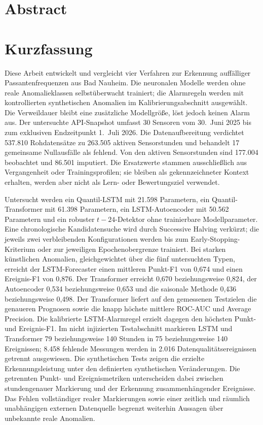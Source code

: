 \ifdefined\ThesisLanguageIsEnglish
\chapter*{Abstract}
\else
\chapter*{Kurzfassung}
\fi
\label{ch:Abstract}

Diese Arbeit entwickelt und vergleicht vier Verfahren zur Erkennung
auffälliger Passantenfrequenzen aus Bad Nauheim. Die neuronalen Modelle werden
ohne reale Anomalieklassen selbstüberwacht trainiert; die Alarmregeln werden
mit kontrollierten synthetischen Anomalien im Kalibrierungsabschnitt
ausgewählt. Die Verweildauer bleibt eine zusätzliche Modellgröße, löst jedoch
keinen Alarm aus. Der untersuchte API-Snapshot umfasst
30 Sensoren vom 30.~Juni 2025 bis zum exklusiven Endzeitpunkt 1.~Juli 2026.
Die Datenaufbereitung verdichtet 537.810 Rohdatensätze zu 263.505 aktiven
Sensorstunden und behandelt 17 gemeinsame Nullausfälle als fehlend. Von den
aktiven Sensorstunden sind 177.004 beobachtet und 86.501 imputiert. Die
Ersatzwerte stammen ausschließlich aus Vergangenheit oder Trainingsprofilen;
sie bleiben als gekennzeichneter Kontext erhalten, werden aber nicht als Lern-
oder Bewertungsziel verwendet.

Untersucht werden ein Quantil-LSTM mit 21.598 Parametern, ein
Quantil-Transformer mit 61.398 Parametern, ein LSTM-Autoencoder mit 50.562
Parametern und ein robuster $t-24$-Detektor ohne trainierbare
Modellparameter. Eine
chronologische Kandidatensuche wird durch Successive Halving verkürzt; die
jeweils zwei verbleibenden Konfigurationen werden bis zum
Early-Stopping-Kriterium oder zur jeweiligen Epochenobergrenze trainiert. Bei
starken künstlichen Anomalien, gleichgewichtet über die fünf untersuchten
Typen, erreicht der
LSTM-Forecaster einen mittleren Punkt-F1 von 0{,}674 und einen Ereignis-F1 von
0{,}876. Der Transformer erreicht 0{,}670 beziehungsweise 0{,}824, der
Autoencoder 0{,}534 beziehungsweise 0{,}653 und die saisonale Methode 0{,}436
beziehungsweise 0{,}498. Der Transformer liefert auf den gemessenen Testzielen
die genaueren Prognosen sowie die knapp höchste mittlere ROC-AUC und Average
Precision. Die kalibrierte LSTM-Alarmregel erzielt dagegen den höchsten Punkt-
und Ereignis-F1. Im nicht injizierten Testabschnitt markieren LSTM und
Transformer 79 beziehungsweise 140 Stunden in 75 beziehungsweise 140
Ereignissen; 8.458 fehlende Messungen werden in 2.016
Datenqualitätsereignissen getrennt ausgewiesen. Die synthetischen Tests
zeigen die erzielte Erkennungsleistung unter den definierten synthetischen
Veränderungen. Die getrennten Punkt- und Ereignismetriken unterscheiden dabei
zwischen stundengenauer Markierung und der Erkennung zusammenhängender
Ereignisse.
Das Fehlen vollständiger realer Markierungen sowie einer zeitlich und räumlich
unabhängigen externen Datenquelle begrenzt weiterhin Aussagen über unbekannte
reale Anomalien.

